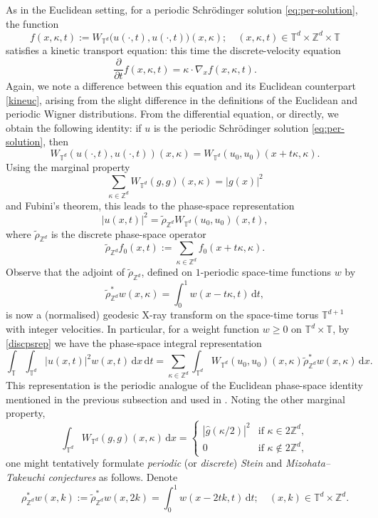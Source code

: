 \documentclass[11pt,reqno]{amsart}
\numberwithin{equation}{section}
\newcommand{\dd}{\,\mathrm{d}}
\renewcommand{\geq}{\geqslant}
\begin{document}
As in the Euclidean setting, for a periodic Schr\"{o}dinger solution
\eqref{eq:per-solution}, the function
\[ f(x,\kappa,t) := W_{\mathbb{T}^d}\bigl(u(\cdot,t),u(\cdot,t)\bigr)(x,\kappa);\quad (x,\kappa,t)\in\mathbb{T}^d\times\mathbb{Z}^d\times\mathbb{T} \]
satisfies a kinetic transport equation: this time the discrete-velocity equation
\begin{equation*}%
\frac{\partial}{\partial t}f(x,\kappa,t) = \kappa\cdot\nabla_x f(x,\kappa,t).
\end{equation*}
Again, we note a difference between this equation and its Euclidean counterpart \eqref{kineuc}, arising from the slight difference in the definitions of the Euclidean and periodic Wigner distributions. 
From the differential equation, or directly, we obtain the following identity: if $u$ is the periodic Schr\"{o}dinger solution \eqref{eq:per-solution}, then
\[ W_{\mathbb{T}^d}(u(\cdot,t),u(\cdot,t))(x,\kappa)
=W_{\mathbb{T}^d}(u_0,u_0)(x+t\kappa,\kappa). \]
Using the marginal property
\[ \sum_{\kappa\in\mathbb{Z}^d}W_{\mathbb{T}^d}(g,g)(x,\kappa)=|g(x)|^2 \]
and Fubini's theorem,
this leads to the phase-space representation
\begin{equation}\label{discpsrep}
|u(x,t)|^2=\widetilde{\rho}_{\mathbb{Z}^{d}}W_{\mathbb{T}^d}(u_0,u_0)(x,t),
\end{equation}
where $\widetilde{\rho}_{\mathbb{Z}^d}$ is the discrete phase-space operator
\[ \widetilde{\rho}_{\mathbb{Z}^d}f_0(x,t):=\sum_{\kappa\in\mathbb{Z}^d}f_0(x+t\kappa,\kappa). \]
Observe that the adjoint of $\widetilde{\rho}_{\mathbb{Z}^d}$, defined on $1$-periodic space-time functions $w$ by
\begin{equation*}%
\widetilde{\rho}^{\ast}_{\mathbb{Z}^d}w(x,\kappa)=\int_0^1w(x-t\kappa,t)\dd t,
\end{equation*}
is now a (normalised) geodesic X-ray transform on the space-time torus $\mathbb{T}^{d+1}$ with integer velocities.
In particular, for a weight function $w\geq0$ on $\mathbb{T}^d\times\mathbb{T}$, by \eqref{discpsrep} we have the phase-space integral representation
\[ \int_{\mathbb{T}} \int_{\mathbb{T}^d} |u(x,t)|^2w(x,t)\dd x\dd t
= \sum_{\kappa\in\mathbb{Z}^d}\int_{\mathbb{T}^d} W_{\mathbb{T}^d}(u_0,u_0)(x,\kappa)\widetilde{\rho}^{\ast}_{\mathbb{Z}^d}w(x,\kappa)\dd x. \]
This representation is the periodic analogue of the Euclidean phase-space identity mentioned in the previous subsection and used in \cite{BGNO}.
Noting the other marginal property,
\[ \int_{\mathbb{T}^d}W_{\mathbb{T}^d}(g,g)(x,\kappa)\dd x
= \begin{cases}
|\widehat{g}(\kappa/2)|^2 & \text{if } \kappa\in 2\mathbb{Z}^d, \\ 
0 & \text{if } \kappa\not\in 2\mathbb{Z}^d,
\end{cases} \]
one might tentatively formulate \emph{periodic} (or \emph{discrete}) \emph{Stein} and \emph{Mizohata--Takeuchi conjectures} as follows.
Denote
\[ \rho^{\ast}_{\mathbb{Z}^d}w(x,k) := \widetilde{\rho}^{\ast}_{\mathbb{Z}^d}w(x,2k) = \int_0^1 w(x-2tk,t)\dd t; \quad (x,k)\in\mathbb{T}^d\times\mathbb{Z}^d. \]
\end{document}
